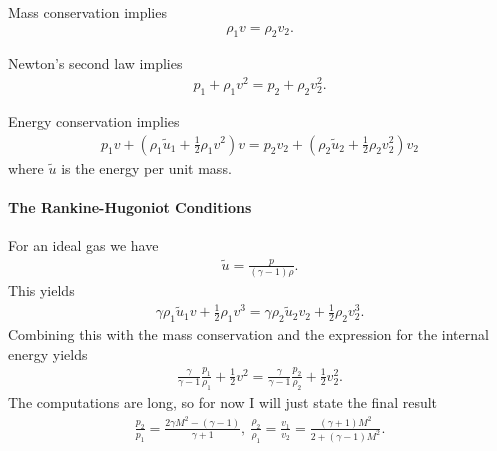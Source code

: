 Mass conservation implies
\begin{align*}
	\rho_{1}v = \rho_{2}v_{2}.
\end{align*}

Newton's second law implies
\begin{align*}
	p_{1} + \rho_{1}v^{2} = p_{2} + \rho_{2}v_{2}^{2}.
\end{align*}

Energy conservation implies
\begin{align*}
	p_{1}v + \left(\rho_{1}\tilde{u}_{1} + \frac{1}{2}\rho_{1}v^{2}\right)v = p_{2}v_{2} + \left(\rho_{2}\tilde{u}_{2} + \frac{1}{2}\rho_{2}v_{2}^{2}\right)v_{2}
\end{align*}
where $\tilde{u}$ is the energy per unit mass.

\paragraph{The Rankine-Hugoniot Conditions}
For an ideal gas we have
\begin{align*}
	\tilde{u} = \frac{p}{(\gamma - 1)\rho}.
\end{align*}
This yields
\begin{align*}
	\gamma\rho_{1}\tilde{u}_{1}v + \frac{1}{2}\rho_{1}v^{3} = \gamma\rho_{2}\tilde{u}_{2}v_{2} + \frac{1}{2}\rho_{2}v_{2}^{3}.
\end{align*}
Combining this with the mass conservation and the expression for the internal energy yields
\begin{align*}
	\frac{\gamma}{\gamma - 1}\frac{p_{1}}{\rho_{1}} + \frac{1}{2}v^{2} = \frac{\gamma}{\gamma - 1}\frac{p_{2}}{\rho_{2}} + \frac{1}{2}v_{2}^{2}.
\end{align*}
The computations are long, so for now I will just state the final result
\begin{align*}
	\frac{p_{2}}{p_{1}} = \frac{2\gamma M^{2} - (\gamma - 1)}{\gamma + 1},\ \frac{\rho_{2}}{\rho_{1}} = \frac{v_{1}}{v_{2}} = \frac{(\gamma + 1)M^{2}}{2 + (\gamma - 1)M^{2}}.
\end{align*}

